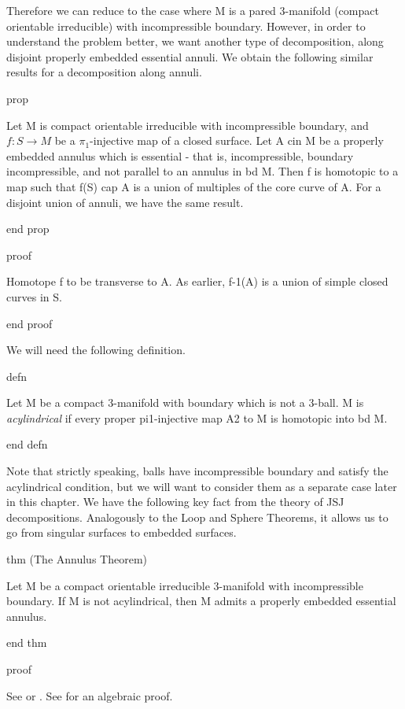 Therefore we can reduce to the case where M is a pared 3-manifold (compact
orientable irreducible) with incompressible boundary. However, in order to
understand the problem better, we want another type of decomposition, along
disjoint properly embedded essential annuli. We obtain the following similar
results for a decomposition along annuli.

prop

Let M is compact orientable irreducible with incompressible boundary, and $f
\colon S \to M$ be a $\pi_1$-injective map of a closed surface. Let A cin M be
a properly embedded annulus which is essential - that is, incompressible,
boundary incompressible, and not parallel to an annulus in bd M. Then f is
homotopic to a map such that f(S) cap A is a union of multiples of the core
curve of A. For a disjoint union of annuli, we have the same result.

end prop

proof

Homotope f to be transverse to A. As earlier, f-1(A) is a union of simple
closed curves in S.

end proof


We will need the following definition.

defn

Let M be a compact 3-manifold with boundary which is not a 3-ball. M is
\emph{acylindrical} if every proper pi1-injective map A2 to M is homotopic into
bd M.

end defn

Note that strictly speaking, balls have incompressible boundary and satisfy the
acylindrical condition, but we will want to consider them as a separate case
later in this chapter. We have the following key fact from the theory of JSJ
decompositions.  Analogously to the Loop and Sphere Theorems, it allows us to
go from singular surfaces to embedded surfaces.

thm (The Annulus Theorem)

Let M be a compact orientable irreducible 3-manifold with incompressible
boundary. If M is not acylindrical, then M admits a properly embedded essential
annulus.

end thm

proof

See \cite{JacoShalen} or \cite{Johannson}. See \cite{Scottannulus} for an
algebraic proof.

